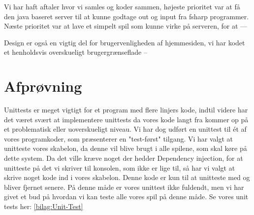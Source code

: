 \documentclass[12pt, a4paper]{article}
\begin{document}


Vi har haft aftaler hvor vi samles og koder sammen, højeste prioritet var at få den java baseret server til at kunne godtage out og input fra fsharp programmer.
Næste prioritet var at lave et simpelt spil som kunne virke på serveren, for at ---

Design er også en vigtig del for brugervenligheden af hjemmesiden, vi har kodet et henholdsvis overskueligt brugergrænseflade --


\section{Afprøvning}


Unittests er meget vigtigt for et program med flere linjers kode, indtil videre har det været svært at implementere unittests da vores kode langt fra kommer op på et problematisk eller uoverskueligt niveau. Vi har dog udført en unittest til ét af vores programkoder, som præsenterer en "test-først" tilgang. Vi har valgt at unitteste vores skabelon, da denne vil blive brugt i alle spilene, som skal køre på dette system. Da det ville kræve noget der hedder Dependency injection, for at unitteste på det vi skriver til konsolen, som ikke er lige til, så har vi valgt at skrive noget kode ind i vores skabelon. Denne kode er kun til at unitteste med og bliver fjernet senere. På denne måde er vores unittest ikke fuldendt, men vi har givet et bud på hvordan vi kan teste alle vores spil på denne måde. Se vores unit tests her: \ref{bilag:Unit-Test} \\


\end{document}
